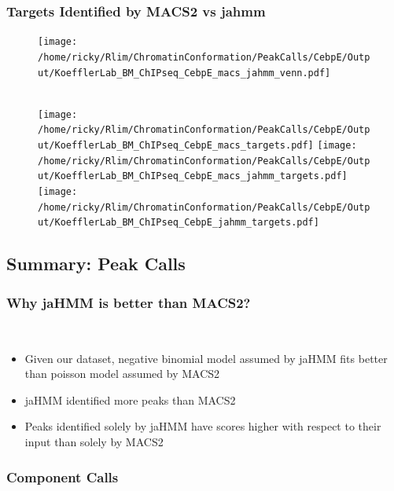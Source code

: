 \documentclass[notes]{beamer}
\begin{document}
\begin{frame}[plain]
    \frametitle{Targets Identified by MACS2 vs jahmm}
    \begin{figure}
        \begin{center}
            \texttt{[image: /home/ricky/Rlim/ChromatinConformation/PeakCalls/CebpE/Output/KoefflerLab\_BM\_ChIPseq\_CebpE\_macs\_jahmm\_venn.pdf]}
        \end{center}
        \\
        \texttt{[image: /home/ricky/Rlim/ChromatinConformation/PeakCalls/CebpE/Output/KoefflerLab\_BM\_ChIPseq\_CebpE\_macs\_targets.pdf]}
        \texttt{[image: /home/ricky/Rlim/ChromatinConformation/PeakCalls/CebpE/Output/KoefflerLab\_BM\_ChIPseq\_CebpE\_macs\_jahmm\_targets.pdf]}
        \texttt{[image: /home/ricky/Rlim/ChromatinConformation/PeakCalls/CebpE/Output/KoefflerLab\_BM\_ChIPseq\_CebpE\_jahmm\_targets.pdf]}
    \end{figure}
\end{frame}

\subsection{Summary: Peak Calls}
\begin{frame}
    \frametitle{Why jaHMM is better than MACS2?}\\
    \begin{itemize}[<+->]
        \item Given our dataset, negative binomial model assumed by jaHMM fits better than poisson model assumed by MACS2
        \item jaHMM identified more peaks than MACS2
        \item Peaks identified solely by jaHMM have scores higher with respect to their input than solely by MACS2  
    \end{itemize}
\end{frame}

\subsubsection{Component Calls}
\begin{frame}

\end{frame}
\end{document}
